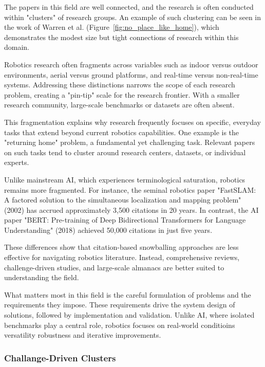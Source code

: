 \documentclass[runningheads]{llncs}
\begin{document}
The papers in this field are well connected, and the research is often conducted within "clusters" of research groups. An example of such clustering can be seen in the work of Warren et al. (Figure~\ref{fig:no_place_like_home}), which demonstrates the modest size but tight connections of research within this domain.

Robotics research often fragments across variables such as indoor versus outdoor environments, aerial versus ground platforms, and real-time versus non-real-time systems. Addressing these distinctions narrows the scope of each research problem, creating a "pin-tip" scale for the research frontier. With a smaller research community, large-scale benchmarks or datasets are often absent.

This fragmentation explains why research frequently focuses on specific, everyday tasks that extend beyond current robotics capabilities. One example is the "returning home" problem, a fundamental yet challenging task. Relevant papers on such tasks tend to cluster around research centers, datasets, or individual experts.

Unlike mainstream AI, which experiences terminological saturation, robotics remains more fragmented. For instance, the seminal robotics paper "FastSLAM: A factored solution to the simultaneous localization and mapping problem" (2002) has accrued approximately 3,500 citations in 20 years. In contrast, the AI paper "BERT: Pre-training of Deep Bidirectional Transformers for Language Understanding" (2018) achieved 50,000 citations in just five years. 

These differences show that citation-based snowballing approaches are less effective for navigating robotics literature. Instead, comprehensive reviews, challenge-driven studies, and large-scale almanacs are better suited to understanding the field.

What matters most in this field is the careful formulation of problems and the requirements they impose. These requirements drive the system design of solutions, followed by implementation and validation. Unlike AI, where isolated benchmarks play a central role, robotics focuses on real-world conditioins versatility robustness and iterative improvements.


\subsubsection{Challange-Driven Clusters}
\end{document}
